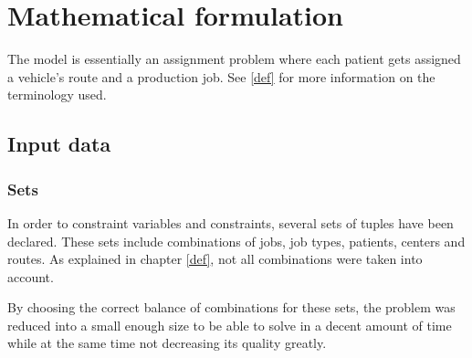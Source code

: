 \chapter{Mathematical formulation}
\label{matmod}

The model is essentially an assignment problem where each patient gets assigned a vehicle's route and a production job. See \ref{def} for more information on the terminology used.

\section{Input data}

\subsection{Sets}



In order to constraint variables and constraints, several sets of tuples have been declared. These sets include combinations of jobs, job types, patients, centers and routes. As explained in chapter \ref{def}, not all combinations were taken into account.

By choosing the correct balance of combinations for these sets, the problem was reduced into a small enough size to be able to solve in a decent amount of time while at the same time not decreasing its quality greatly.


